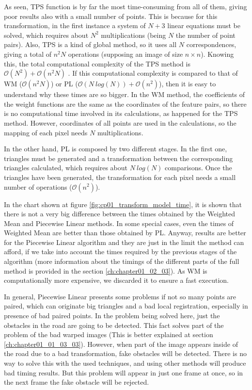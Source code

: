 As seen, \ac{TPS} function is by far the most time-consuming from all of them, giving poor results also with a small number of points. This is because for this transformation, in the first instance a system of $N + 3$ linear equations must be solved, which requires about $N^2$ multiplications (being $N$ the number of point pairs). Also, TPS is a kind of global method, so it uses all $N$ correspondences, giving a total of $n^2N$ operations (supposing an image of size $n \times n$). Knowing this, the total computational complexity of the TPS method is $\mathcal{O}(N^2) + \mathcal{O}(n^2N)$ \citep{zagorchev2006comparative}. If this computational complexity is compared to that of \ac{WM} ($\mathcal{O}(n^2N)$) or \ac{PL} ($\mathcal{O}(N~log(N)) + \mathcal{O}(n^2)$), then it is easy to understand why these times are so bigger. In the \acf{WM} method, the coefficients of the weight functions are the same as the coordinates of the feature pairs, so there is no computational time involved in its calculations, as happened for the \ac{TPS} method. However, coordinates of all points are used in the calculations, so the mapping of each pixel needs $N$ multiplications.

In the other hand, \acf{PL} is composed by two different stages. In the first one, triangles must be generated and a transformation between the corresponding triangles calculated, which requires about $N~log(N)$ comparisons. Once the triangles have been generated, the transformation for each pixel needs a small number of operations ($\mathcal{O}(n^2)$).

In the chart shown at figure \ref{fig:cp01_transform_model_time}, it is shown that there is not a very big difference between the times obtained by the Weighted Mean and Piecewise Linear methods. In some special cases, even the times of Weighted Mean are better than those obtained by \ac{PL}. Anyway, results are better for the Piecewise Linear algorithm and they are just in the limit the method can afford, if we take into account the times required by the previous stages of the algorithm (more information about the timings of the different parts of the full method is provided in the section \ref{ch:chapter01_02_03}). As \ac{WM} is computationally more expensive, we discarded it to ensure a fast execution.

In general, Piecewise Linear presents some problems if not so many points are paired, which can originate big triangles and a bad local registration, especially in presence of bad paired points. In the problem being solved here, just the obstacles in the road are going to be detected. This fact solves part of the problem of the bad warped images (This is better explained at section \ref{ch:chapter01_01_03_03}). However, when part of the image appears inside of the road due to a bad transformation, fake obstacles will be detected. There is no way to solve this with the used techniques, and using other methods will produce bad timing results. But this problem will appear in just one frame at once, so in the next frame the fake obstacle will be rejected.

